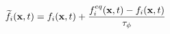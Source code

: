 \documentclass[10pt]{article}
\begin{document}
\begin{align*}\widetilde{f_i}(\bold{x},t)=f_i(\bold{x},t)+\frac{f_i^{eq}(\bold{x},t)-f_i(\bold{x},t)}{\tau_\phi}
\end{align*}
\end{document}
